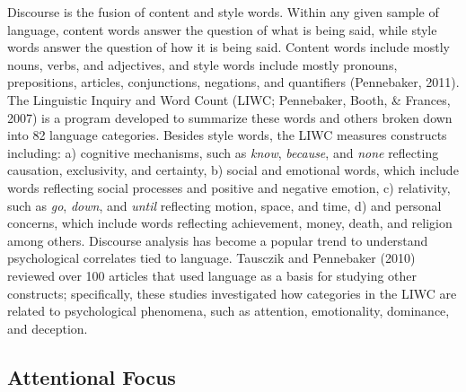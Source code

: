 \documentclass[english,man]{apa6}
\theoremstyle{definition}
\theoremstyle{definition}
\theoremstyle{definition}
\theoremstyle{remark}
\begin{document}
Discourse is the fusion of content and style words. Within any given
sample of language, content words answer the question of what is being
said, while style words answer the question of how it is being said.
Content words include mostly nouns, verbs, and adjectives, and style
words include mostly pronouns, prepositions, articles, conjunctions,
negations, and quantifiers (Pennebaker, 2011). The Linguistic Inquiry
and Word Count (LIWC; Pennebaker, Booth, \& Frances, 2007) is a program
developed to summarize these words and others broken down into 82
language categories. Besides style words, the LIWC measures constructs
including: a) cognitive mechanisms, such as \emph{know}, \emph{because},
and \emph{none} reflecting causation, exclusivity, and certainty, b)
social and emotional words, which include words reflecting social
processes and positive and negative emotion, c) relativity, such as
\emph{go}, \emph{down}, and \emph{until} reflecting motion, space, and
time, d) and personal concerns, which include words reflecting
achievement, money, death, and religion among others. Discourse analysis
has become a popular trend to understand psychological correlates tied
to language. Tausczik and Pennebaker (2010) reviewed over 100 articles
that used language as a basis for studying other constructs;
specifically, these studies investigated how categories in the LIWC are
related to psychological phenomena, such as attention, emotionality,
dominance, and deception.

\subsection{Attentional Focus}\label{attentional-focus}
\end{document}

